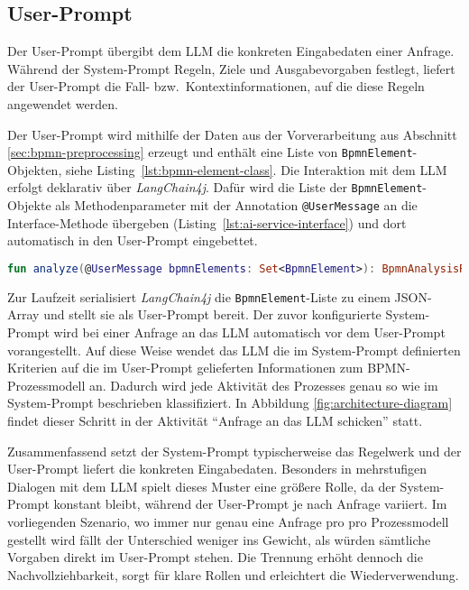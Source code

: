\subsection*{User-Prompt}

Der User-Prompt übergibt dem \ac{LLM} die konkreten Eingabedaten einer Anfrage. Während der System-Prompt Regeln, Ziele und Ausgabevorgaben festlegt, liefert der User-Prompt die Fall- bzw.\ Kontextinformationen, auf die diese Regeln angewendet werden.

Der User-Prompt wird mithilfe der Daten aus der Vorverarbeitung aus Abschnitt \ref{sec:bpmn-preprocessing} erzeugt und enthält eine Liste von \texttt{BpmnElement}-Objekten, siehe Listing~\ref{lst:bpmn-element-class}. Die Interaktion mit dem \ac{LLM} erfolgt deklarativ über \emph{LangChain4j}. Dafür wird die Liste der \texttt{BpmnElement}-Objekte als Methodenparameter mit der Annotation \texttt{@UserMessage} an die Interface-Methode übergeben (Listing~\ref{lst:ai-service-interface}) und dort automatisch in den User-Prompt eingebettet.

\begin{lstlisting}[language=Kotlin,caption={Deklarative Schnittstelle für die Analyse eines \ac{BPMN}-Prozesses.},label={lst:ai-service-interface}]
fun analyze(@UserMessage bpmnElements: Set<BpmnElement>): BpmnAnalysisResult
\end{lstlisting}

Zur Laufzeit serialisiert \emph{LangChain4j} die \texttt{BpmnElement}-Liste zu einem JSON-Array und stellt sie als User-Prompt bereit. Der zuvor konfigurierte System-Prompt wird bei einer Anfrage an das \ac{LLM} automatisch vor dem User-Prompt vorangestellt. Auf diese Weise wendet das \ac{LLM} die im System-Prompt definierten Kriterien auf die im User-Prompt gelieferten Informationen zum \ac{BPMN}-Prozessmodell an. Dadurch wird jede Aktivität des Prozesses genau so wie im System-Prompt beschrieben klassifiziert. In Abbildung \ref{fig:architecture-diagram} findet dieser Schritt in der Aktivität \enquote{Anfrage an das LLM schicken} statt.

Zusammenfassend setzt der System-Prompt typischerweise das Regelwerk und der User-Prompt liefert die konkreten Eingabedaten. Besonders in mehrstufigen Dialogen mit dem \ac{LLM} spielt dieses Muster eine größere Rolle, da der System-Prompt konstant bleibt, während der User-Prompt je nach Anfrage variiert. Im vorliegenden Szenario, wo immer nur genau eine Anfrage pro pro Prozessmodell gestellt wird fällt der Unterschied weniger ins Gewicht, als würden sämtliche Vorgaben direkt im User-Prompt stehen. Die Trennung erhöht dennoch die Nachvollziehbarkeit, sorgt für klare Rollen und erleichtert die Wiederverwendung.

